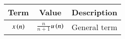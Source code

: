   
  \begin{tabular}{|c|c|c|}
    \hline
    \textbf{Term} & \textbf{Value} & \textbf{Description}\\
    \hline
    $x\left(n\right)$ & $\frac{n}{n+1}$$u\left(n\right)$ & General term\\
    \hline
  \end{tabular}
  
